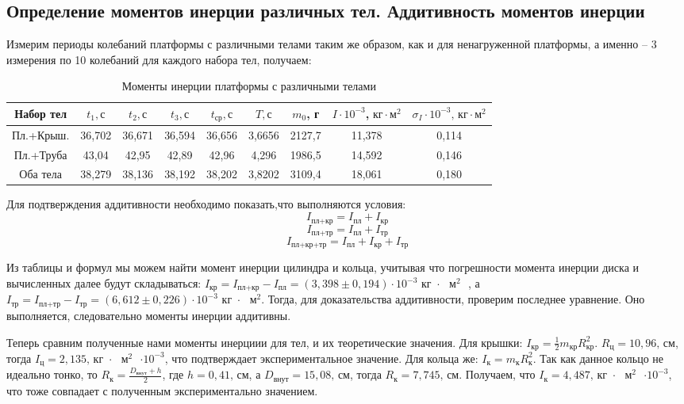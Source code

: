 \documentclass[a4paper,12pt]{article}
\begin{document}
\subsection*{Определение моментов инерции различных тел. Аддитивность моментов инерции}
    Измерим периоды колебаний платформы с различными телами таким же образом, как и для ненагруженной платформы, а именно -- 3 измерения по 10 колебаний для каждого набора тел, получаем:
	\begin{table}[H]
        \begin{center}
            \begin{tabular}{|c|c|c|c|c|c|c|c|c|}
                \hline 
                Набор тел & $t_1, с$ & $t_2, с$ & $t_3, с$ & $t_\text{ср}, с$ & $T, с$ & $m_0$, г & $I \cdot 10^{-3}$,$\text{ кг} \cdot \text{м}^2$ & $\sigma_I \cdot 10^{-3}\text{, кг} \cdot \text{м}^2$\\
                \hline
                Пл.+Крыш. & 36,702 & 36,671 & 36,594 &  36,656  & 3,6656 & 2127,7 & 11,378 & 0,114\\
                \hline 
                Пл.+Труба & 43,04 & 42,95 & 42,89 & 42,96 & 4,296 & 1986,5 & 14,592 & 0,146\\
                \hline 
                Оба тела & 38,279 & 38,136 & 38,192 & 38,202 & 3,8202 & 3109,4 & 18,061 & 0,180\\
                \hline 
            \end{tabular}
            \caption{Моменты инерции платформы с различными телами}
        \end{center}
    \end{table} 

    Для подтверждения аддитивности необходимо показать,что выполняются условия:
    $$I_\text{пл+кр} = I_\text{пл} + I_\text{кр}$$
    $$I_\text{пл+тр} = I_\text{пл} + I_\text{тр}$$
    $$I_\text{пл+кр+тр} = I_\text{пл} + I_\text{кр} + I_\text{тр}$$

    Из таблицы и формул мы можем найти момент инерции цилиндра и кольца, учитывая что погрешности момента инерции диска и вычисленных далее будут складываться: $I_\text{кр} = I_\text{пл+кр} - I_\text{пл} = \left(3,398 \pm 0,194\right) \cdot 10^{-3} \text{ кг $\cdot$ $\text{м}^2$ }$, а $I_\text{тр} = I_\text{пл+тр} - I_\text{тр} = \left(6,612 \pm 0,226\right) \cdot 10^{-3} \text{ кг $\cdot$ $\text{м}^2$}$.
    Тогда, для доказательства аддитивности, проверим последнее уравнение. Оно выполняется, следовательно моменты инерции аддитивны.
    
    Теперь сравним полученные нами моменты инерциии для тел, и их теоретические значения. Для крышки: $I_\text{кр} = \frac{1}{2}m_\text{кр}R_\text{кр}^2$. $R_\text{ц} = 10,96\text{, см}$, тогда $I_\text{ц} = 2,135 \text{,  кг $\cdot$ $\text{м}^2$ $\cdot 10^{-3}$}$, что подтверждает экспериментальное значение.
	Для кольца же: $I_\text{к} = m_\text{к}R_\text{к}^2$. Так как данное кольцо не идеально тонко, то $R_\text{к} = \frac{D_\text{внут} + h}{2}$, где $h = 0,41 \text{, см}$, а $D_\text{внут} = 15,08\text{, см}$, тогда $R_\text{к} = 7,745 \text{, см}$. Получаем, что $I_\text{к} = 4,487\text{,  кг $\cdot$ $\text{м}^2$ $\cdot 10^{-3}$}$, что тоже совпадает с полученным экспериментально значением.
\end{document}

